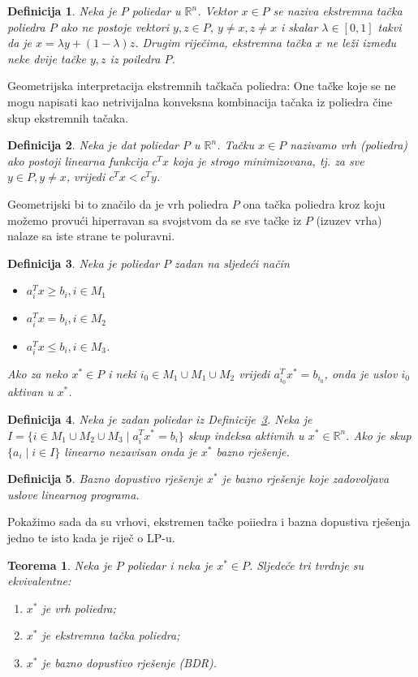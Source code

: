 \documentclass[a4paper, utf8, 11pt, colorlinks]{article}
\newtheorem{definition}{Definicija}
\newtheorem{thm}{Teorema}
\begin{document}
\begin{definition}
   Neka je $P$ poliedar u $\mathbb{R}^n$.  Vektor $x \in P$ se naziva ekstremna tačka poliedra $P$
   ako ne postoje vektori $y, z \in P$, $y \neq x, z \neq x$ i skalar $\lambda \in [0, 1]$ takvi da je  $x = \lambda y + (1-\lambda)z$. Drugim riječima, ekstremna tačka $x$ ne leži između neke dvije tačke $y,z$ iz poiledra $P$.
\end{definition}
Geometrijska interpretacija ekstremnih tačkača poliedra:  One tačke koje se ne mogu napisati kao netrivijalna konveksna kombinacija tačaka iz poliedra čine skup ekstremnih tačaka. 
 
\begin{definition}
   Neka je dat poliedar $P$ u $\mathbb{R}^n$. Tačku $x \in P$ nazivamo vrh (poliedra) ako postoji linearna funkcija  $c^T x$ koja je strogo minimizovana, tj. za sve  $y\in P, y \neq x$, vrijedi $c^T x < c^T y$. 
\end{definition}
Geometrijski bi to značilo da je vrh poliedra $P$ ona tačka poliedra  kroz koju možemo provući hiperravan sa svojstvom da se sve tačke iz $P$ (izuzev vrha) nalaze sa iste strane te poluravni.

\begin{definition}\label{dfn:lp_aktivan}
   Neka je poliedar $P$ zadan na sljedeći način
   \begin{itemize}
       \item $a_i^T x \geq b_i, i \in M_1$
       \item $a_i^T x = b_i, i \in M_2 $
       \item $a_i^T x \leq b_i, i \in M_3 $. 
   \end{itemize}
   Ako za neko $x^* \in P$ i neki $i_0 \in M_1 \cup M_1 \cup M_2$ vrijedi 
   $a_{i_0}^T x^* = b_{i_0}$, onda je uslov $i_0$ aktivan u $x^*$. 
\end{definition}

\begin{definition}
      Neka je zadan poliedar iz Definicije~\ref{dfn:lp_aktivan}. Neka je 
      $I = \{ i \in M_1 \cup M_2 \cup M_3 \mid a_i^T x^* = b_i \}$  skup indeksa aktivnih u $x^*\in \mathbb{R}^n$.  Ako je skup $\{ a_i \mid i \in I \}$ linearno nezavisan onda je $x^*$ bazno rješenje. 
\end{definition}
\begin{definition}
	 Bazno dopustivo rješenje $x^*$ je bazno rješenje koje zadovoljava  uslove linearnog programa. 
\end{definition}
Pokažimo sada da su vrhovi, ekstremen tačke poiiedra i bazna dopustiva rješenja jedno te isto kada je riječ o LP-u.
\begin{thm}
   Neka je $P$ poliedar i neka je $x^* \in P$. Sljedeće tri tvrdnje su ekvivalentne:
   \begin{enumerate}
       \item $x^*$ je vrh poliedra;
       \item $x^*$ je ekstremna tačka poliedra;
       \item $x^*$ je bazno dopustivo rješenje (BDR).
   \end{enumerate}
\end{thm}
\end{document}
